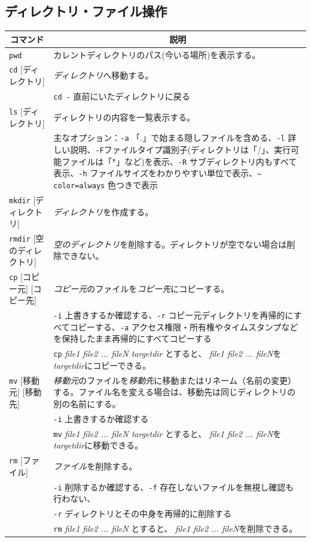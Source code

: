 \documentclass[a4j]{ltjsreport}
\begin{document}
    \subsection{ディレクトリ・ファイル操作}
    \begin{longtable}[c]{|p{3.5cm}|p{13.5cm}|}
        \hline
        \multicolumn{1}{|c|}{\textbf{コマンド}}&\multicolumn{1}{|c|}{\textbf{説明}}\\
        \hline\hline

        \texttt{pwd}&カレントディレクトリのパス(今いる場所)を表示する。\\
        \hline 
        \texttt{cd} [ディレクトリ]&\emph{ディレクトリ}へ移動する。 \\
        &\texttt{cd -} 直前にいたディレクトリに戻る\\
        \hline
        \texttt{ls} [ディレクトリ]&ディレクトリの内容を一覧表示する。\\
        &主なオプション：\texttt{-a} 「.」で始まる隠しファイルを含める、\texttt{-l} 詳しい説明、\texttt{-F}ファイルタイプ識別子(ディレクトリは「/」、実行可能ファイルは「*」など)を表示、\texttt{-R} サブディレクトリ内もすべて表示、\texttt{-h} ファイルサイズをわかりやすい単位で表示、\texttt{--color=always} 色つきで表示 \\
        \hline

        \texttt{mkdir} [ディレクトリ]&\emph{ディレクトリ}を作成する。\\
        \hline
        \texttt{rmdir} {\small [空のディレクトリ]}&\emph{空のディレクトリ}を削除する。ディレクトリが空でない場合は削除できない。\\
        \hline

        \texttt{cp} [コピー元] [コピー先]&\emph{コピー元}のファイルを\emph{コピー先}にコピーする。\\
        &\texttt{-i} 上書きするか確認する、\texttt{-r} コピー元ディレクトリを再帰的にすべてコピーする、\texttt{-a} アクセス権限・所有権やタイムスタンプなどを保持したまま再帰的にすべてコピーする\\
        &\texttt{cp} \textit{file1 file2 ... fileN targetdir} とすると、\textit{ file1 file2 ... fileN}を\textit{ targetdir}にコピーできる。\\
        \hline
        \texttt{mv} [移動元] [移動先]&\emph{移動元}のファイルを\emph{移動先}に移動またはリネーム（名前の変更）する。ファイル名を変える場合は、移動先は同じディレクトリの別の名前にする。\\
        &\texttt{-i} 上書きするか確認する\\
        &\texttt{mv} \textit{file1 file2 ... fileN targetdir} とすると、\textit{ file1 file2 ... fileN}を\textit{ targetdir}に移動できる。\\
        \hline
        \texttt{rm} [ファイル]&\emph{ファイル}を削除する。\\
        &\texttt{-i} 削除するか確認する、\texttt{-f} 存在しないファイルを無視し確認も行わない、\\
        &\texttt{-r} ディレクトリとその中身を再帰的に削除する\\
        &\texttt{rm} \textit{file1 file2 ... fileN} とすると、\textit{ file1 file2 ... fileN}を削除できる。\\
        \hline


\end{longtable}
\end{document}
